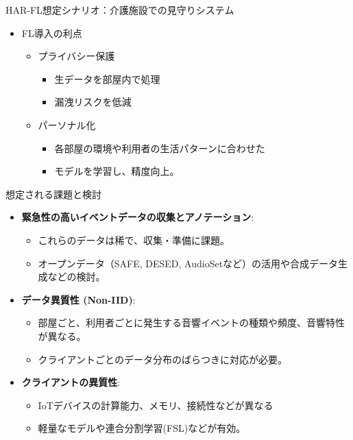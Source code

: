 \documentclass[unicode,12pt,aspectratio=169,dvipdfmx]{beamer}
\begin{document}
\begin{frame}{HAR-FL想定シナリオ：介護施設での見守りシステム}
    \begin{itemize}
        \item FL導入の利点
        \begin{itemize}
            \item プライバシー保護
            \begin{itemize}
                \item 生データを部屋内で処理
                \item 漏洩リスクを低減
            \end{itemize}
            \item{パーソナル化}
            \begin{itemize}
                \item 各部屋の環境や利用者の生活パターンに合わせた
                \item モデルを学習し、精度向上。
            \end{itemize}
        \end{itemize}
    \end{itemize}
\end{frame}


\begin{frame}{想定される課題と検討}
    \begin{itemize}
        \item \textbf{緊急性の高いイベントデータの収集とアノテーション}:
        \begin{itemize}
            \item これらのデータは稀で、収集・準備に課題。
            \item オープンデータ（SAFE, DESED, AudioSetなど）の活用や合成データ生成などの検討。
        \end{itemize}
        \item \textbf{データ異質性 (Non-IID)}:
        \begin{itemize}
            \item 部屋ごと、利用者ごとに発生する音響イベントの種類や頻度、音響特性が異なる。
            \item クライアントごとのデータ分布のばらつきに対応が必要。
        \end{itemize}
        \item \textbf{クライアントの異質性}:
        \begin{itemize}
            \item IoTデバイスの計算能力、メモリ、接続性などが異なる 
            \item 軽量なモデルや連合分割学習(FSL)などが有効。
        \end{itemize}
    \end{itemize}
\end{frame}
\end{document}
